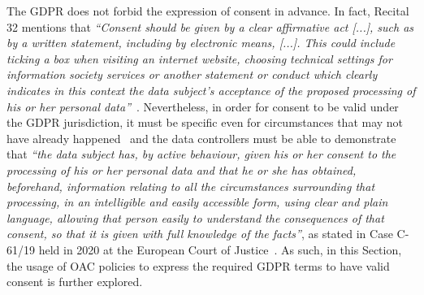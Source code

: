 The GDPR does not forbid the expression of consent in advance.
In fact, Recital 32 mentions that \textit{``Consent should be given by a clear affirmative act [...], such as by a written statement, including by electronic means, [...]. This could include ticking a box when visiting an internet website, choosing technical settings for information society services or another statement or conduct which clearly indicates in this context the data subject’s acceptance of the proposed processing of his or her personal data''}~\citeyearpar{noauthor_regulation_2016}.
Nevertheless, in order for consent to be valid under the GDPR jurisdiction, it must be specific even for circumstances that may not have already happened~\citep{kosta_consent_2013} and the data controllers must be able to demonstrate that \textit{``the data subject has, by active behaviour, given his or her consent to the processing of his or her personal data and that he or she has obtained, beforehand, information relating to all the circumstances surrounding that processing, in an intelligible and easily accessible form, using clear and plain language, allowing that person easily to understand the consequences of that consent, so that it is given with full knowledge of the facts''}, as stated in Case C-61/19 held in 2020 at the European Court of Justice~\citeyearpar{noauthor_orange_2020}.
As such, in this Section, the usage of OAC policies to express the required GDPR terms to have valid consent is further explored. 
 
